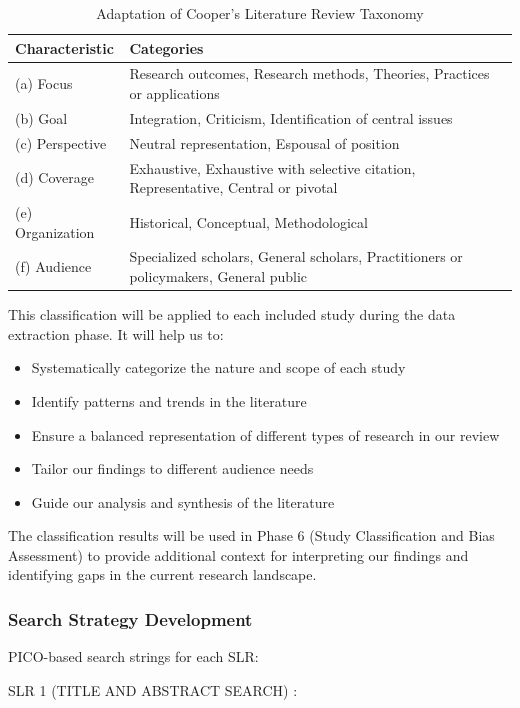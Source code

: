 \documentclass[a4paper,12pt]{article}
\begin{document}
\begin{table}[ht]
\caption{Adaptation of Cooper's Literature Review Taxonomy}
\begin{tabularx}{\textwidth}{lX}
\toprule
Characteristic & Categories \\
\midrule
(a) Focus     & Research outcomes, Research methods, Theories, Practices or applications \\
(b) Goal      & Integration, Criticism, Identification of central issues \\
(c) Perspective & Neutral representation, Espousal of position \\
(d) Coverage  & Exhaustive, Exhaustive with selective citation, Representative, Central or pivotal \\
(e) Organization & Historical, Conceptual, Methodological \\
(f) Audience  & Specialized scholars, General scholars, Practitioners or policymakers, General public \\
\bottomrule
\end{tabularx}
\end{table}

This classification will be applied to each included study during the data extraction phase. It will help us to:

\begin{itemize}
    \item Systematically categorize the nature and scope of each study
    \item Identify patterns and trends in the literature
    \item Ensure a balanced representation of different types of research in our review
    \item Tailor our findings to different audience needs
    \item Guide our analysis and synthesis of the literature
\end{itemize}

The classification results will be used in Phase 6 (Study Classification and Bias Assessment) to provide additional context for interpreting our findings and identifying gaps in the current research landscape.

\subsubsection{Search Strategy Development}
PICO-based search strings for each SLR:

SLR 1 (TITLE AND ABSTRACT SEARCH) :
\end{document}

